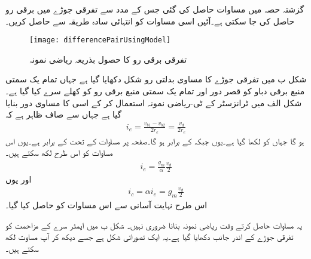  گزشتہ حصہ میں مساوات   حاصل کی گئی جس کے مدد سے تفرقی جوڑے میں برقی رو    حاصل کی جا سکتی ہے۔آئیں اسی مساوات کو انتہائی سادہ طریقہ سے  حاصل کریں۔
\begin{figure}
\centering
\texttt{[image: differencePairUsingModel]}
\caption{تفرقی برقی رو کا حصول بذریعہ ریاضی نمونہ}
\label{شکل_تفرقی_رو_بذریعہ_ماڈل}
\end{figure}
شکل  ب میں تفرقی جوڑے کا مساوی بدلتی رو شکل دکھایا گیا ہے جہاں تمام یک سمتی منبع برقی دباو کو قصر دور  اور تمام یک سمتی منبع برقی رو کو کھلے سرے  کیا گیا ہے۔شکل  الف میں ٹرانزسٹر کے ٹی-ریاضی نمونہ استعمال کر کے اسی کا مساوی دور بنایا گیا ہے جہاں سے صاف ظاہر ہے کہ
\begin{align}
i_e=\frac{v_{b1}-v_{b2}}{2 r_e}=\frac{v_d}{2 r_e}
\end{align}
ہو گا جہاں   کو  لکھا گیا ہے۔یوں  جبکہ  کے برابر ہو گا۔صفحہ  پر مساوات  کے تحت  کے برابر ہے۔یوں اس مساوات کو اس طرح لکھ سکتے ہیں۔
\begin{align}
i_e=\frac{g_m}{\alpha} \frac{v_d}{2}
\end{align}
اور یوں
\begin{align}
i_c = \alpha i_e = g_m \frac{v_d}{2}
\end{align}
اس طرح نہایت آسانی سے اس مساوات کو حاصل کیا گیا۔

یہ مساوات حاصل کرتے وقت ریاضی نمونہ بنانا ضروری نہیں۔ شکل  ب میں ایمٹر سرے کے مزاحمت  کو تفرقی جوڑے کے اندر جانب دکھایا گیا ہے۔یہ ایک تصوراتی شکل ہے جسے دیکھ کر آپ مساوت  لکھ سکتے ہیں۔

